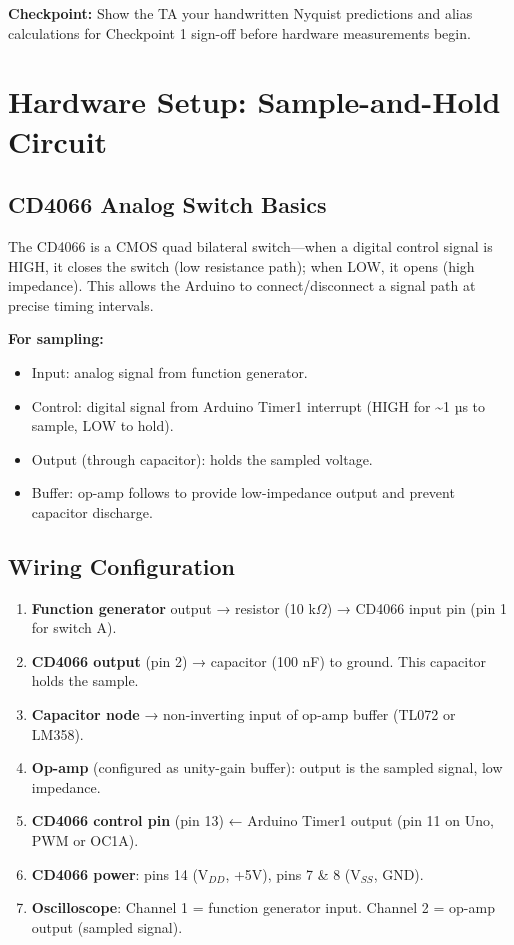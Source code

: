 \documentclass[11pt,letterpaper]{article}
\providecommand{\cpECE}[1]{\textcolor{OliveGreen}{\textbf{Checkpoint:} #1}}
\begin{document}
\cpECE{Show the TA your handwritten Nyquist predictions and alias calculations for Checkpoint 1 sign-off before hardware measurements begin.}

\clearpage

\section{Hardware Setup: Sample-and-Hold Circuit}

\subsection{CD4066 Analog Switch Basics}

The CD4066 is a CMOS quad bilateral switch—when a digital control signal is HIGH, it closes the switch (low resistance path); when LOW, it opens (high impedance). This allows the Arduino to connect/disconnect a signal path at precise timing intervals.

\textbf{For sampling:}
\begin{itemize}
    \item Input: analog signal from function generator.
    \item Control: digital signal from Arduino Timer1 interrupt (HIGH for \textasciitilde 1 µs to sample, LOW to hold).
    \item Output (through capacitor): holds the sampled voltage.
    \item Buffer: op-amp follows to provide low-impedance output and prevent capacitor discharge.
\end{itemize}

\subsection{Wiring Configuration}

\begin{enumerate}
    \item \textbf{Function generator} output → resistor (10 k$\Omega$) → CD4066 input pin (pin 1 for switch A).
    \item \textbf{CD4066 output} (pin 2) → capacitor (100 nF) to ground. This capacitor holds the sample.
    \item \textbf{Capacitor node} → non-inverting input of op-amp buffer (TL072 or LM358).
    \item \textbf{Op-amp} (configured as unity-gain buffer): output is the sampled signal, low impedance.
    \item \textbf{CD4066 control pin} (pin 13) ← Arduino Timer1 output (pin 11 on Uno, PWM or OC1A).
    \item \textbf{CD4066 power}: pins 14 (V$_{DD}$, +5V), pins 7 \& 8 (V$_{SS}$, GND).
    \item \textbf{Oscilloscope}: Channel 1 = function generator input. Channel 2 = op-amp output (sampled signal).
\end{enumerate}
\end{document}
